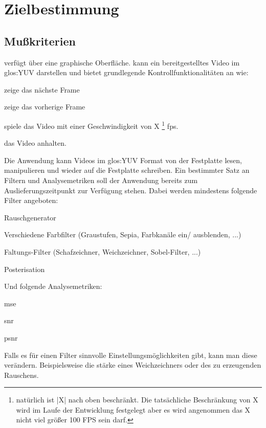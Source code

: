 \chapter{Zielbestimmung}

\section{Mußkriterien}
\setcounter{counterKriterien}{0}
 \projektTitel verfügt über eine graphische Oberfläche.
 \projektTitel kann ein bereitgestelltes Video im \gls{glos:YUV} darstellen und bietet grundlegende Kontrollfunktionalitäten an wie:
\begin{compactitem}
\item zeige das nächste Frame
\item zeige das vorherige Frame
\item spiele das Video mit einer Geschwindigkeit von X \footnote{ natürlich ist |X| nach oben beschränkt. Die tatsächliche Beschränkung von X wird im Laufe der Entwicklung festgelegt aber es wird angenommen das X nicht viel größer 100 FPS sein darf.} \gls{fps}.
\item das Video anhalten.
\end{compactitem} 
 Die Anwendung kann Videos im \gls{glos:YUV} Format von der Festplatte lesen, manipulieren und wieder auf die Festplatte schreiben.
 Ein bestimmter Satz an Filtern und Analysemetriken soll der Anwendung bereits zum Auslieferungszeitpunkt zur Verfügung stehen. 
Dabei werden mindestens folgende Filter angeboten:
\begin{compactitem}
\item Rauschgenerator
\item Verschiedene Farbfilter (Graustufen, Sepia, Farbkanäle ein/ ausblenden, ...)
\item Faltungs-Filter (Schafzeichner, Weichzeichner, Sobel-Filter, ...)
\item Posterisation
\end{compactitem}
Und folgende Analysemetriken:
\begin{compactitem}
\item \gls{mse}
\item \gls{snr}
\item \gls{psnr}
\end{compactitem}
 Falls es für einen Filter sinnvolle Einstellungsmöglichkeiten gibt, kann man diese verändern. Beispielsweise die stärke eines Weichzeichners oder des zu erzeugenden Rauschens.
